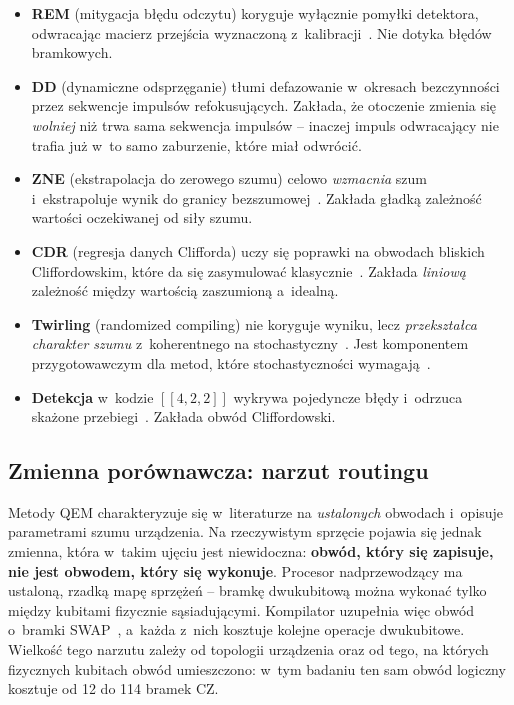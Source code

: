 \documentclass[11pt]{article}
\begin{document}
\begin{itemize}
  \item \textbf{REM} (mitygacja błędu odczytu) koryguje wyłącznie pomyłki detektora, odwracając
        macierz przejścia wyznaczoną z~kalibracji~\cite{maciejewski2020,nation2021}. Nie dotyka
        błędów bramkowych.
  \item \textbf{DD} (dynamiczne odsprzęganie) tłumi defazowanie w~okresach bezczynności przez
        sekwencje impulsów refokusujących. Zakłada, że otoczenie zmienia się \emph{wolniej} niż
        trwa sama sekwencja impulsów -- inaczej impuls odwracający nie trafia już w~to samo
        zaburzenie, które miał odwrócić.
  \item \textbf{ZNE} (ekstrapolacja do zerowego szumu) celowo \emph{wzmacnia} szum i~ekstrapoluje
        wynik do granicy bezszumowej~\cite{temme2017,giurgica2020,kandala2019}. Zakłada gładką
        zależność wartości oczekiwanej od siły szumu.
  \item \textbf{CDR} (regresja danych Clifforda) uczy się poprawki na obwodach bliskich
        Cliffordowskim, które da się zasymulować klasycznie~\cite{czarnik2021}. Zakłada
        \emph{liniową} zależność między wartością zaszumioną a~idealną.
  \item \textbf{Twirling} (randomized compiling) nie koryguje wyniku, lecz \emph{przekształca
        charakter szumu} z~koherentnego na stochastyczny~\cite{wallman2016,hashim2021}. Jest
        komponentem przygotowawczym dla metod, które stochastyczności
        wymagają~\cite{ferracin2022}.
  \item \textbf{Detekcja} w~kodzie $[[4,2,2]]$ wykrywa pojedyncze błędy i~odrzuca skażone
        przebiegi~\cite{vuillot2018,linke2017}. Zakłada obwód Cliffordowski.
\end{itemize}

\subsection{Zmienna porównawcza: narzut routingu}\label{sec:routing-wstep}

Metody QEM charakteryzuje się w~literaturze na \emph{ustalonych} obwodach i~opisuje parametrami
szumu urządzenia. Na rzeczywistym sprzęcie pojawia się jednak zmienna, która w~takim ujęciu jest
niewidoczna: \textbf{obwód, który się zapisuje, nie jest obwodem, który się wykonuje}. Procesor
nadprzewodzący ma ustaloną, rzadką mapę sprzężeń -- bramkę dwukubitową można wykonać tylko między
kubitami fizycznie sąsiadującymi. Kompilator uzupełnia więc obwód o~bramki SWAP~\cite{li2019},
a~każda z~nich kosztuje kolejne operacje dwukubitowe. Wielkość tego narzutu zależy od topologii
urządzenia oraz od tego, na których fizycznych kubitach obwód umieszczono: w~tym badaniu ten sam
obwód logiczny kosztuje od 12 do 114 bramek CZ.
\end{document}
